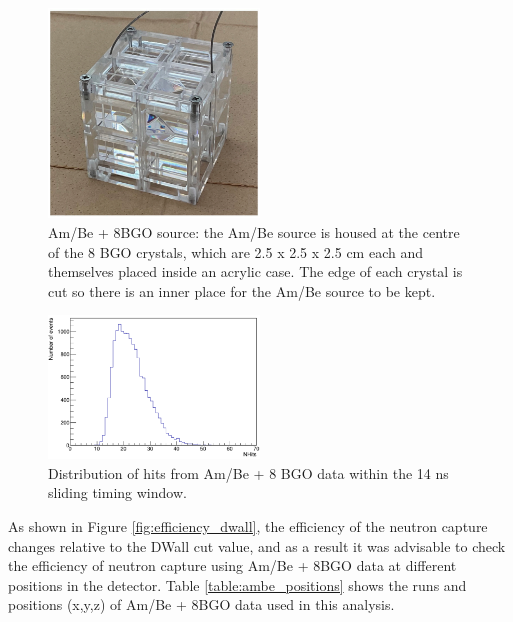 \begin{figure}
    \centering
    \includegraphics[width=0.5\textwidth]{Figures/ambe_picture.PNG}
    \caption{Am/Be + 8BGO source: the Am/Be source is housed at the centre of the 8 BGO crystals, which are 2.5 x 2.5 x 2.5 cm each and themselves placed inside an acrylic case. The edge of each crystal is cut so there is an inner place for the Am/Be source to be kept.}
    \label{fig:ambe_picture}
\end{figure}


\begin{figure}
    \centering
    \includegraphics[width=0.5\textwidth]{Figures/NHits_ambe_distribution.PNG}
    \caption{Distribution of hits from Am/Be + 8 BGO data within the 14 ns sliding timing window.}
    \label{fig:ambe_NHits}
\end{figure}




As shown in Figure \ref{fig:efficiency_dwall}, the efficiency of the neutron capture changes relative to the DWall cut value, and as a result it was advisable to check the efficiency of neutron capture using Am/Be + 8BGO data at different positions in the detector. Table \ref{table:ambe_positions} shows the runs and positions (x,y,z) of Am/Be + 8BGO data used in this analysis.

